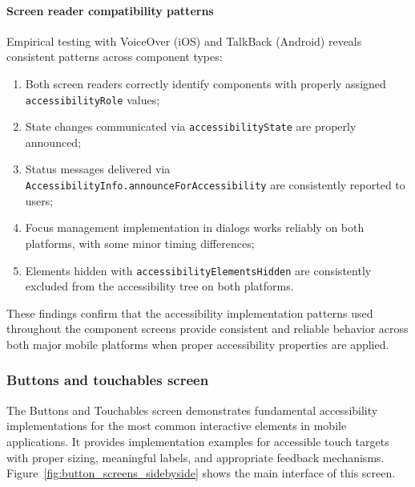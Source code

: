 \paragraph{Screen reader compatibility patterns}

Empirical testing with VoiceOver (iOS) and TalkBack (Android) reveals consistent patterns across component types:

\begin{enumerate}
    \item Both screen readers correctly identify components with properly assigned \\ \texttt{accessibilityRole} values;
    
    \item State changes communicated via \texttt{accessibilityState} are properly announced;
    
    \item Status messages delivered via \texttt{AccessibilityInfo.announceForAccessibility} are consistently reported to users;
    
    \item Focus management implementation in dialogs works reliably on both platforms, with some minor timing differences;
    
    \item Elements hidden with \texttt{accessibilityElementsHidden} are consistently excluded from the accessibility tree on both platforms.
\end{enumerate}

These findings confirm that the accessibility implementation patterns used throughout the component screens provide consistent and reliable behavior across both major mobile platforms when proper accessibility properties are applied.

\subsubsection{Buttons and touchables screen}
\label{subsubsec:buttons-touchables}

The Buttons and Touchables screen demonstrates fundamental accessibility implementations for the most common interactive elements in mobile applications. It provides implementation examples for accessible touch targets with proper sizing, meaningful labels, and appropriate feedback mechanisms. Figure~\ref{fig:button_screens_sidebyside} shows the main interface of this screen.

